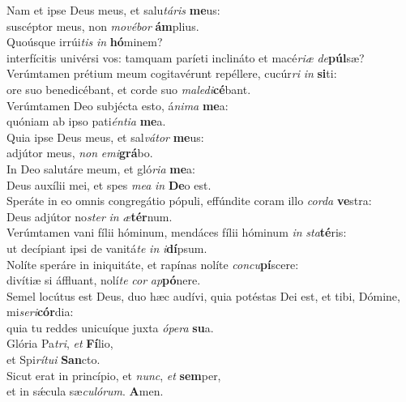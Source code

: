\evenverse Nam et ipse Deus meus, et salu\textit{tá}\textit{ris} \textbf{me}us:~\*\\
\evenverse suscéptor meus, non \textit{mo}\textit{vé}\textit{bor} \textbf{ám}plius.\\
\oddverse Quoúsque irrúi\textit{tis} \textit{in} \textbf{hó}minem?~\*\\
\oddverse interfícitis univérsi vos: tamquam paríeti inclináto et macé\textit{ri}\textit{æ} \textit{de}\textbf{púl}sæ?\\
\evenverse Verúmtamen prétium meum cogitavérunt repéllere, cucúr\textit{ri} \textit{in} \textbf{si}ti:~\*\\
\evenverse ore suo benedicébant, et corde suo \textit{ma}\textit{le}\textit{di}\textbf{cé}bant.\\
\oddverse Verúmtamen Deo subjécta esto, á\textit{ni}\textit{ma} \textbf{me}a:~\*\\
\oddverse quóniam ab ipso pati\textit{én}\textit{ti}\textit{a} \textbf{me}a.\\
\evenverse Quia ipse Deus meus, et sal\textit{vá}\textit{tor} \textbf{me}us:~\*\\
\evenverse adjútor meus, \textit{non} \textit{e}\textit{mi}\textbf{grá}bo.\\
\oddverse In Deo salutáre meum, et gló\textit{ri}\textit{a} \textbf{me}a:~\*\\
\oddverse Deus auxílii mei, et spes \textit{me}\textit{a} \textit{in} \textbf{De}o est.\\
\evenverse Speráte in eo omnis congregátio pópuli, effúndite coram illo \textit{cor}\textit{da} \textbf{ve}stra:~\*\\
\evenverse Deus adjútor no\textit{ster} \textit{in} \textit{æ}\textbf{tér}num.\\
\oddverse Verúmtamen vani fílii hóminum, mendáces fílii hóminum \textit{in} \textit{sta}\textbf{té}ris:~\*\\
\oddverse ut decípiant ipsi de vanitá\textit{te} \textit{in} \textit{i}\textbf{dí}psum.\\
\evenverse Nolíte speráre in iniquitáte, et rapínas nolíte \textit{con}\textit{cu}\textbf{pí}scere:~\*\\
\evenverse divítiæ si áffluant, nolí\textit{te} \textit{cor} \textit{ap}\textbf{pó}nere.\\
\oddverse Semel locútus est Deus, duo hæc audívi, quia potéstas Dei est, et tibi, Dómine, mi\textit{se}\textit{ri}\textbf{cór}dia:~\*\\
\oddverse quia tu reddes unicuíque juxta \textit{ó}\textit{pe}\textit{ra} \textbf{su}a.\\
\evenverse Glória Pa\textit{tri}, \textit{et} \textbf{Fí}lio,~\*\\
\evenverse et Spi\textit{rí}\textit{tu}\textit{i} \textbf{San}cto.\\
\oddverse Sicut erat in princípio, et \textit{nunc}, \textit{et} \textbf{sem}per,~\*\\
\oddverse et in sǽcula sæ\textit{cu}\textit{ló}\textit{rum}. \textbf{A}men.\\
